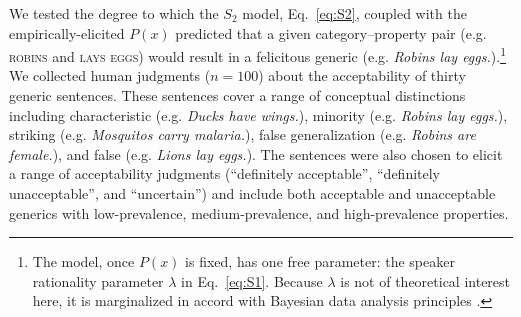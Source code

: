 \documentclass{pnastwo}
\begin{document}
\begin{article}
We tested the degree to which the $S_2$ model, Eq.~\ref{eq:S2}, coupled with the empirically-elicited $P(x)$ predicted that a given category--property pair (e.g. \textsc{robins} and \textsc{lays eggs}) would result in a felicitous generic (e.g. \emph{Robins lay eggs.}).\footnote{The model, once $P(x)$ is fixed, has one free parameter: the speaker rationality parameter $\lambda$ in Eq.~\ref{eq:S1}. Because $\lambda$ is not of theoretical interest here, it is marginalized in accord with Bayesian data analysis principles \cite{LW2014}. } 
We collected human judgments ($n=100$) about the acceptability of thirty generic sentences. 
These sentences cover a range of conceptual distinctions  \cite{Prasada2013} including characteristic (e.g. \emph{Ducks have wings.}), minority (e.g. \emph{Robins lay eggs.}), striking (e.g. \emph{Mosquitos carry malaria.}), false generalization (e.g. \emph{Robins are female.}), and false (e.g. \emph{Lions lay eggs.}).
The sentences were also chosen to elicit a range of acceptability judgments (``definitely acceptable'', ``definitely unacceptable'', and ``uncertain'') and include both acceptable and unacceptable generics with low-prevalence, medium-prevalence, and high-prevalence properties.
%



% 



\end{article}
\end{document}
